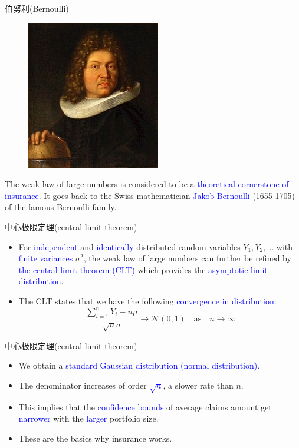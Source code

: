 \documentclass[professionalfont]{beamer}
\newcommand{\blue}[1]{\textcolor{blue}{#1}}
\begin{document}
\begin{frame}{伯努利(Bernoulli)}
\begin{figure}
\includegraphics[width=0.3\linewidth]{Plots/Bernoulli.jpg}
\end{figure}
The weak law of large numbers is considered to be a \blue{theoretical cornerstone of insurance}. It goes back to the Swiss mathematician \blue{Jakob Bernoulli} (1655-1705) of the famous Bernoulli family.
\end{frame}

\begin{frame}{中心极限定理(central limit theorem)}
\begin{itemize}
\item For \blue{independent} and \blue{identically} distributed random variables $Y_1, Y_2, \ldots$ with \blue{finite variances} $\sigma^2$, the weak law of large numbers can further be refined by \blue{the central limit theorem (CLT)} which provides the \blue{asymptotic limit distribution}. 
\item The CLT states that we have the following \blue{convergence in distribution}:
\begin{equation}\label{clt}
\frac{\sum_{i=1}^n Y_i-n\mu}{\sqrt{n}\sigma}\rightarrow \mathcal{N}(0,1) \text{~~~as~~~} n\rightarrow\infty
\end{equation}
\end{itemize}
\end{frame}

\begin{frame}{中心极限定理(central limit theorem)}
\begin{itemize}
\item We obtain a \blue{standard Gaussian distribution (normal distribution)}. 
\item The denominator increases of order \blue{$\sqrt{n}$}, a slower rate than $n$. 
\item This implies that the \blue{confidence bounds} of average claims amount get \blue{narrower} with the \blue{larger} portfolio size. 
\item These are the basics why insurance works.
\end{itemize}
\end{frame}
\end{document}
